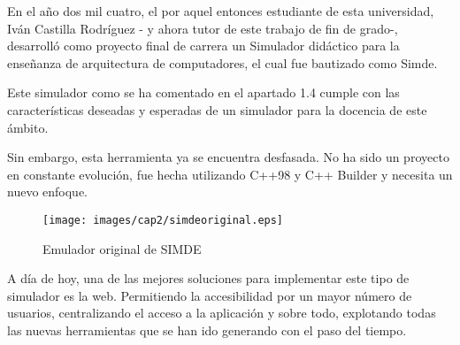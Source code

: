 
En el año dos mil cuatro, el por aquel entonces estudiante de esta universidad, 
Iván Castilla Rodríguez - y ahora tutor de este trabajo de fin de grado-, 
desarrolló como proyecto final de carrera un Simulador didáctico para la enseñanza 
de arquitectura de computadores, el cual fue bautizado como Simde. 

\bigskip
Este simulador como se ha comentado en el apartado 1.4 cumple con las características
deseadas y esperadas de un simulador para la docencia de este ámbito.

\bigskip
Sin embargo, esta herramienta ya se encuentra desfasada. No ha sido un proyecto en constante
evolución, fue hecha utilizando C++98 y C++ Builder y necesita un nuevo enfoque.

\begin{figure}[!th]
\begin{center}
\texttt{[image: images/cap2/simdeoriginal.eps]}
\caption{Emulador original de SIMDE}
\label{fig:Emulador original de SIMDE}
\end{center}
\end{figure}

A día de hoy, una de las mejores soluciones para implementar este tipo de simulador es la web.
Permitiendo la accesibilidad por un mayor número de usuarios, centralizando el acceso a la 
aplicación y sobre todo, explotando todas las nuevas herramientas que se han ido generando
con el paso del tiempo.
